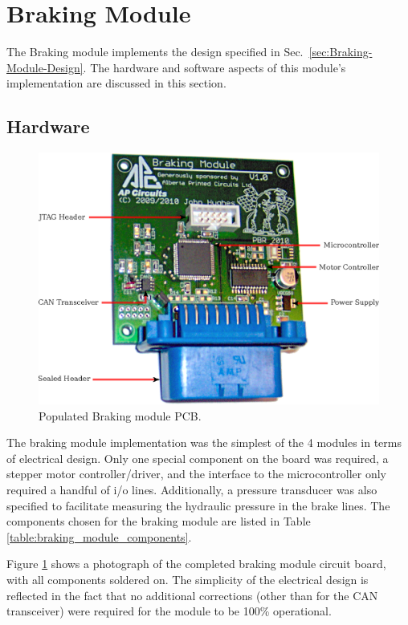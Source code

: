 \section{Braking Module}

The Braking module implements the design specified in Sec.\ \ref{sec:Braking-Module-Design}. The hardware and software aspects of this module's implementation are discussed in this section.

\subsection{Hardware}

\begin{figure}[h]
\centering
\includegraphics[scale=1]{implementation/figures/braking_pcb}
\caption{Populated Braking module PCB.}
\label{fig:braking_pcb}
\end{figure}

The braking module implementation was the simplest of the 4 modules in terms of electrical design. Only one special component on the board was required, a stepper motor controller/driver, and the interface to the microcontroller only required a handful of i/o lines. Additionally, a pressure transducer was also specified to facilitate measuring the hydraulic pressure in the brake lines. The components chosen for the braking module are listed in Table \ref{table:braking_module_components}.

Figure \ref{fig:braking_pcb} shows a photograph of the completed braking module circuit board, with all components soldered on. The simplicity of the electrical design is reflected in the fact that no additional corrections (other than for the CAN transceiver) were required for the module to be 100\% operational.

